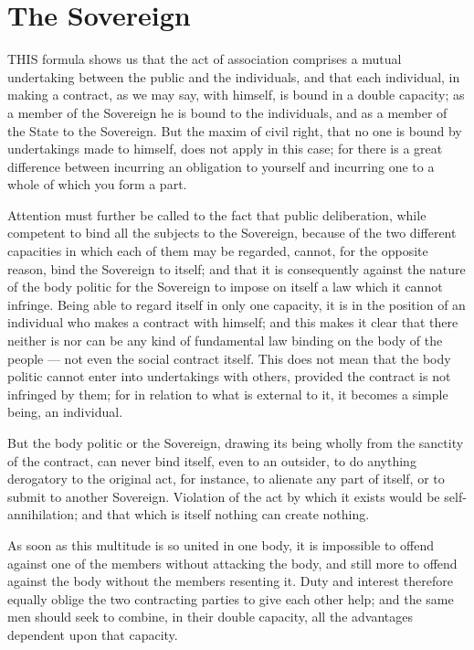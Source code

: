 \documentclass[12pt]{book}
\begin{document}
\section{The Sovereign}
THIS formula shows us that the act of association comprises a mutual undertaking between the public and the individuals, and that each individual, in making a contract, as we may say, with himself, is bound in a double capacity; as a member of the Sovereign he is bound to the individuals, and as a member of the State to the Sovereign. But the maxim of civil right, that no one is bound by undertakings made to himself, does not apply in this case; for there is a great difference between incurring an obligation to yourself and incurring one to a whole of which you form a part.

Attention must further be called to the fact that public deliberation, while competent to bind all the subjects to the Sovereign, because of the two different capacities in which each of them may be regarded, cannot, for the opposite reason, bind the Sovereign to itself; and that it is consequently against the nature of the body politic for the Sovereign to impose on itself a law which it cannot infringe. Being able to regard itself in only one capacity, it is in the position of an individual who makes a contract with himself; and this makes it clear that there neither is nor can be any kind of fundamental law binding on the body of the people — not even the social contract itself. This does not mean that the body politic cannot enter into undertakings with others, provided the contract is not infringed by them; for in relation to what is external to it, it becomes a simple being, an individual.

But the body politic or the Sovereign, drawing its being wholly from the sanctity of the contract, can never bind itself, even to an outsider, to do anything derogatory to the original act, for instance, to alienate any part of itself, or to submit to another Sovereign. Violation of the act by which it exists would be self-annihilation; and that which is itself nothing can create nothing.

As soon as this multitude is so united in one body, it is impossible to offend against one of the members without attacking the body, and still more to offend against the body without the members resenting it. Duty and interest therefore equally oblige the two contracting parties to give each other help; and the same men should seek to combine, in their double capacity, all the advantages dependent upon that capacity.
\end{document}
